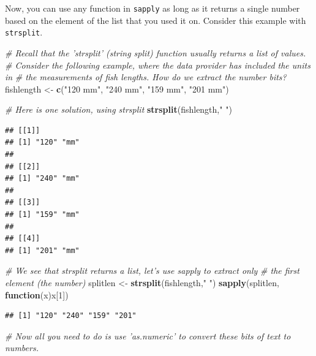 \documentclass[]{book}
\newenvironment{Shaded}{\begin{snugshade}}{\end{snugshade}}
\newcommand{\CommentTok}[1]{\textcolor[rgb]{0.56,0.35,0.01}{\textit{#1}}}
\newcommand{\ControlFlowTok}[1]{\textcolor[rgb]{0.13,0.29,0.53}{\textbf{#1}}}
\newcommand{\DecValTok}[1]{\textcolor[rgb]{0.00,0.00,0.81}{#1}}
\newcommand{\KeywordTok}[1]{\textcolor[rgb]{0.13,0.29,0.53}{\textbf{#1}}}
\newcommand{\NormalTok}[1]{#1}
\newcommand{\StringTok}[1]{\textcolor[rgb]{0.31,0.60,0.02}{#1}}
\begin{document}
Now, you can use any function in \texttt{sapply} as long as it returns a single number based on the element of the list that you used it on. Consider this example with \texttt{strsplit}.

\begin{Shaded}
\begin{Highlighting}[]
\CommentTok{# Recall that the 'strsplit' (string split) function usually returns a list of values. }
\CommentTok{# Consider the following example, where the data provider has included the units in }
\CommentTok{# the measurements of fish lengths. How do we extract the number bits?}
\NormalTok{fishlength <-}\StringTok{ }\KeywordTok{c}\NormalTok{(}\StringTok{"120 mm"}\NormalTok{, }\StringTok{"240 mm"}\NormalTok{, }\StringTok{"159 mm"}\NormalTok{, }\StringTok{"201 mm"}\NormalTok{)}

\CommentTok{# Here is one solution, using strsplit}
\KeywordTok{strsplit}\NormalTok{(fishlength,}\StringTok{" "}\NormalTok{)}
\end{Highlighting}
\end{Shaded}

\begin{verbatim}
## [[1]]
## [1] "120" "mm" 
## 
## [[2]]
## [1] "240" "mm" 
## 
## [[3]]
## [1] "159" "mm" 
## 
## [[4]]
## [1] "201" "mm"
\end{verbatim}

\begin{Shaded}
\begin{Highlighting}[]
\CommentTok{# We see that strsplit returns a list, let's use sapply to extract only }
\CommentTok{# the first element (the number)}
\NormalTok{splitlen <-}\StringTok{ }\KeywordTok{strsplit}\NormalTok{(fishlength,}\StringTok{" "}\NormalTok{)}
\KeywordTok{sapply}\NormalTok{(splitlen, }\ControlFlowTok{function}\NormalTok{(x)x[}\DecValTok{1}\NormalTok{])}
\end{Highlighting}
\end{Shaded}

\begin{verbatim}
## [1] "120" "240" "159" "201"
\end{verbatim}

\begin{Shaded}
\begin{Highlighting}[]
\CommentTok{# Now all you need to do is use 'as.numeric' to convert these bits of text to numbers.}
\end{Highlighting}
\end{Shaded}
\end{document}
